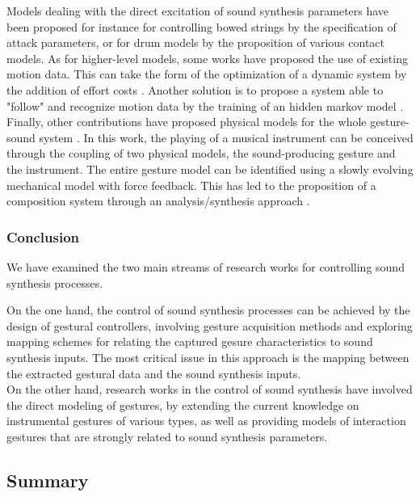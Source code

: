 {{Models dealing with the direct excitation of sound synthesis parameters have been proposed for instance for controlling bowed strings  by the specification of attack parameters, or for drum models  by the proposition of various contact models. As for higher-level models, some works have proposed the use of existing motion data. This can take the form of the optimization of a dynamic system by the addition of effort costs . Another solution is to propose a system able to "follow" and recognize motion data by the training of an hidden markov model . Finally, other contributions have proposed physical models for the whole gesture-sound system . In this work, the playing of a musical instrument can be conceived through the coupling of two physical models, the sound-producing gesture and the instrument. The entire gesture model can be identified using a slowly evolving mechanical model with force feedback. This has led to the proposition of a composition system through an analysis/synthesis approach .


			\subsubsection{Conclusion}
			\label{subsubsec:CM_Control_Conclusion}

We have examined the two main streams of research works for controlling sound synthesis processes.

On the one hand, the control of sound synthesis processes can be achieved by the design of gestural controllers, involving gesture acquisition methods and exploring mapping schemes for relating the captured gesure characteristics to sound synthesis inputs. The most critical issue in this approach is the mapping between the extracted gestural data and the sound synthesis inputs.\\

On the other hand, research works in the control of sound synthesis have involved the direct modeling of gestures, by extending the current knowledge on instrumental gestures of various types, as well as providing models of interaction gestures that are strongly related to sound synthesis parameters.


		\subsection{Summary}
		\label{subsec:CM_summary}

}}
